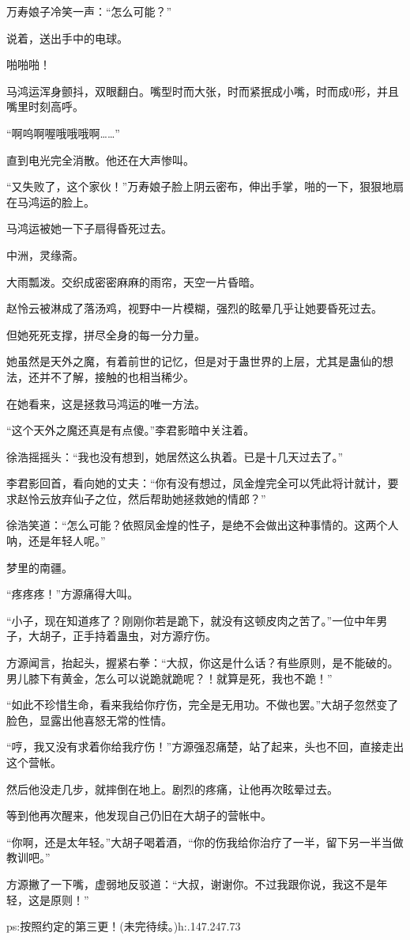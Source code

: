 \begin{this_body}
万寿娘子冷笑一声：“怎么可能？”

说着，送出手中的电球。

啪啪啪！

马鸿运浑身颤抖，双眼翻白。嘴型时而大张，时而紧抿成小嘴，时而成0形，并且嘴里时刻高呼。

“啊呜啊喔哦哦哦啊……”

直到电光完全消散。他还在大声惨叫。

“又失败了，这个家伙！”万寿娘子脸上阴云密布，伸出手掌，啪的一下，狠狠地扇在马鸿运的脸上。

马鸿运被她一下子扇得昏死过去。

中洲，灵缘斋。

大雨瓢泼。交织成密密麻麻的雨帘，天空一片昏暗。

赵怜云被淋成了落汤鸡，视野中一片模糊，强烈的眩晕几乎让她要昏死过去。

但她死死支撑，拼尽全身的每一分力量。

她虽然是天外之魔，有着前世的记忆，但是对于蛊世界的上层，尤其是蛊仙的想法，还并不了解，接触的也相当稀少。

在她看来，这是拯救马鸿运的唯一方法。

“这个天外之魔还真是有点傻。”李君影暗中关注着。

徐浩摇摇头：“我也没有想到，她居然这么执着。已是十几天过去了。”

李君影回首，看向她的丈夫：“你有没有想过，凤金煌完全可以凭此将计就计，要求赵怜云放弃仙子之位，然后帮助她拯救她的情郎？”

徐浩笑道：“怎么可能？依照凤金煌的性子，是绝不会做出这种事情的。这两个人呐，还是年轻人呢。”

梦里的南疆。

“疼疼疼！”方源痛得大叫。

“小子，现在知道疼了？刚刚你若是跪下，就没有这顿皮肉之苦了。”一位中年男子，大胡子，正手持着蛊虫，对方源疗伤。

方源闻言，抬起头，握紧右拳：“大叔，你这是什么话？有些原则，是不能破的。男儿膝下有黄金，怎么可以说跪就跪呢？！就算是死，我也不跪！”

“如此不珍惜生命，看来我给你疗伤，完全是无用功。不做也罢。”大胡子忽然变了脸色，显露出他喜怒无常的性情。

“哼，我又没有求着你给我疗伤！”方源强忍痛楚，站了起来，头也不回，直接走出这个营帐。

然后他没走几步，就摔倒在地上。剧烈的疼痛，让他再次眩晕过去。

等到他再次醒来，他发现自己仍旧在大胡子的营帐中。

“你啊，还是太年轻。”大胡子喝着酒，“你的伤我给你治疗了一半，留下另一半当做教训吧。”

方源撇了一下嘴，虚弱地反驳道：“大叔，谢谢你。不过我跟你说，我这不是年轻，这是原则！”

ps:按照约定的第三更！(未完待续。)h:.147.247.73

\end{this_body}


